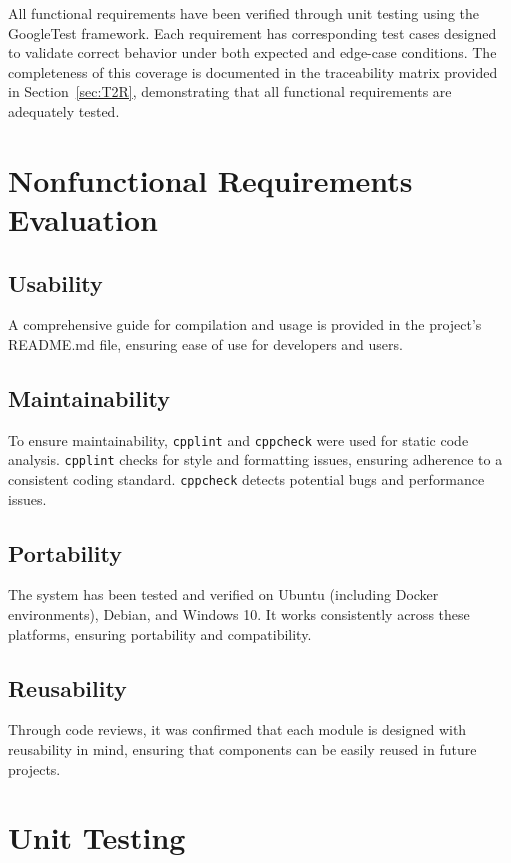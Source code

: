 \documentclass[12pt, titlepage]{article}
\begin{document}
All functional requirements have been verified through unit testing using the
GoogleTest framework. Each requirement has corresponding test cases designed to
validate correct behavior under both expected and edge-case conditions. The
completeness of this coverage is documented in the traceability matrix provided
in Section~\ref{sec:T2R}, demonstrating that all functional requirements are
adequately tested.

\section{Nonfunctional Requirements Evaluation}

\subsection{Usability}

A comprehensive guide for compilation and usage is provided in the project's
README.md file, ensuring ease of use for developers and users.

\subsection{Maintainability}

To ensure maintainability, \texttt{cpplint} and \texttt{cppcheck} were used for
static code analysis. \texttt{cpplint} checks for style and formatting issues,
ensuring adherence to a consistent coding standard. \texttt{cppcheck} detects
potential bugs and performance issues.

\subsection{Portability}

The system has been tested and verified on Ubuntu (including Docker
environments), Debian, and Windows 10. It works consistently across these
platforms, ensuring portability and compatibility.

\subsection{Reusability}

Through code reviews, it was confirmed that each module is designed with
reusability in mind, ensuring that components can be easily reused in future
projects.

\section{Unit Testing}
\end{document}
